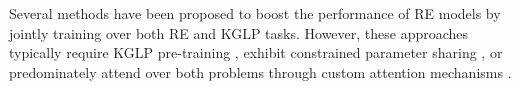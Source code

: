 Several methods have been proposed to boost the performance of RE models by jointly training over both RE and KGLP tasks.
However, these approaches typically require KGLP pre-training \citep[e.g.]{weston-2013, lfds}, exhibit constrained parameter sharing \citep[e.g.]{weston-2013, lfds}, or predominately attend over both problems through custom attention mechanisms \citep[e.g.,][]{bag_re_kglp,han,long_tail}.

